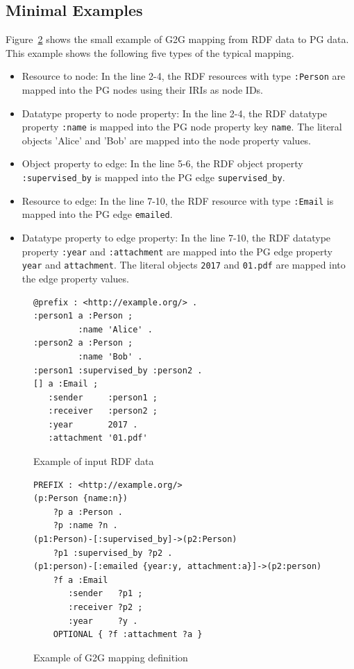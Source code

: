 \documentclass[runningheads]{llncs}
\begin{document}
\subsection{Minimal Examples}
Figure~\ref{fig:example-g2g} shows the small example of G2G mapping from RDF data to PG data. This example shows the following five types of the typical mapping.

\begin{itemize}
    \item Resource to node: In the line 2-4, the RDF resources with type \texttt{:Person} are mapped into the PG nodes using their IRIs as node IDs.
    \item Datatype property to node property: In the line 2-4, the RDF datatype property \texttt{:name} is mapped into the PG node property key \texttt{name}. The literal objects 'Alice' and 'Bob' are mapped into the node property values.
    \item Object property to edge: In the line 5-6, the RDF object property \texttt{:supervised\_by} is mapped into the PG edge \texttt{supervised\_by}.
    \item Resource to edge: In the line 7-10, the RDF resource with type \texttt{:Email} is mapped into the PG edge \texttt{emailed}. 
    \item Datatype property to edge property: In the line 7-10, the RDF datatype property \texttt{:year} and \texttt{:attachment} are mapped into the PG edge property \texttt{year} and \texttt{attachment}. The literal objects \texttt{2017} and \texttt{01.pdf} are mapped into the edge property values.
\end{itemize}


\begin{figure}[!t]
\begin{scriptsize}
\begin{verbatim}
@prefix : <http://example.org/> .
:person1 a :Person ;
         :name 'Alice' .
:person2 a :Person ;
         :name 'Bob' .
:person1 :supervised_by :person2 .
[] a :Email ;
   :sender     :person1 ;
   :receiver   :person2 ;
   :year       2017 .
   :attachment '01.pdf'
\end{verbatim}
\end{scriptsize}
\caption{Example of input RDF data}
\label{fig:example-rdf}
\end{figure}


\begin{figure}[!t]
\begin{scriptsize}
\begin{verbatim}
PREFIX : <http://example.org/>
(p:Person {name:n})
    ?p a :Person .
    ?p :name ?n .
(p1:Person)-[:supervised_by]->(p2:Person)
    ?p1 :supervised_by ?p2 .
(p1:person)-[:emailed {year:y, attachment:a}]->(p2:person)
    ?f a :Email
       :sender   ?p1 ;
       :receiver ?p2 ;
       :year     ?y .
    OPTIONAL { ?f :attachment ?a }
\end{verbatim}
\end{scriptsize}
\caption{Example of G2G mapping definition}
\label{fig:example-g2g}
\end{figure}
\end{document}
